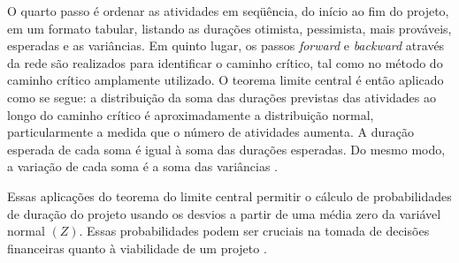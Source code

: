 O quarto passo é ordenar as atividades em seqüência, do início ao fim do projeto, em um formato tabular, listando as durações otimista, pessimista, mais prováveis, esperadas e as variâncias. Em quinto lugar, os passos \textit{forward} e \textit{backward} através da rede são realizados para identificar o caminho crítico, tal como no método do caminho crítico amplamente utilizado. O teorema limite central é então aplicado como se segue: a distribuição da soma das durações previstas das atividades ao longo do caminho crítico é aproximadamente a distribuição normal, particularmente a medida que o número de atividades aumenta. A duração esperada de cada soma é igual à soma das durações esperadas. Do mesmo modo, a variação de cada soma é a soma das variâncias \cite{cottrell1999simplified}.

Essas aplicações do teorema do limite central permitir o cálculo de probabilidades de duração do projeto usando os desvios a partir de uma média zero da variável normal $(Z)$. Essas probabilidades podem ser cruciais na tomada de decisões financeiras quanto à viabilidade de um projeto \cite{cottrell1999simplified}.

